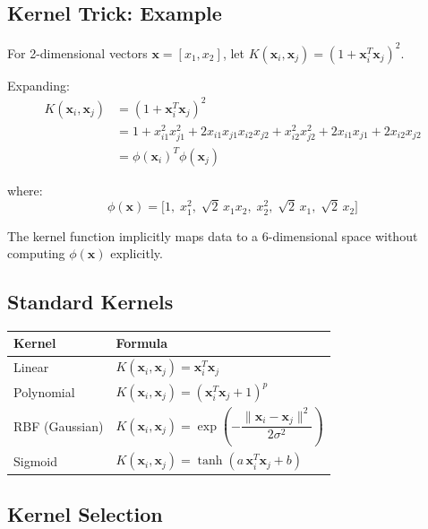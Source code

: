 \documentclass[11pt,a4paper]{article}
\theoremstyle{definition}
\theoremstyle{plain}
\theoremstyle{remark}
\begin{document}
\subsection{Kernel Trick: Example}

For 2-dimensional vectors $\mathbf{x} = [x_1, x_2]$, let $K(\mathbf{x}_i, \mathbf{x}_j) = (1 + \mathbf{x}_i^T \mathbf{x}_j)^2$.

Expanding:
\begin{align*}
K(\mathbf{x}_i, \mathbf{x}_j) &= (1 + \mathbf{x}_i^T \mathbf{x}_j)^2 \\
&= 1 + x_{i1}^2 x_{j1}^2 + 2x_{i1}x_{j1}x_{i2}x_{j2} + x_{i2}^2 x_{j2}^2 + 2x_{i1}x_{j1} + 2x_{i2}x_{j2} \\
&= \phi(\mathbf{x}_i)^T \phi(\mathbf{x}_j)
\end{align*}

where:
\[
\phi(\mathbf{x}) = \big[1, \; x_1^2, \; \sqrt{2}\,x_1 x_2, \; x_2^2, \; \sqrt{2}\,x_1, \; \sqrt{2}\,x_2\big]
\]

The kernel function implicitly maps data to a 6-dimensional space without computing $\phi(\mathbf{x})$ explicitly.

\subsection{Standard Kernels}

\begin{center}
\begin{tabular}{|l|l|}
\hline
\textbf{Kernel} & \textbf{Formula} \\
\hline
Linear & $K(\mathbf{x}_i, \mathbf{x}_j) = \mathbf{x}_i^T \mathbf{x}_j$ \\
\hline
Polynomial & $K(\mathbf{x}_i, \mathbf{x}_j) = (\mathbf{x}_i^T \mathbf{x}_j + 1)^p$ \\
\hline
RBF (Gaussian) & $K(\mathbf{x}_i, \mathbf{x}_j) = \exp\!\left(-\dfrac{\|\mathbf{x}_i - \mathbf{x}_j\|^2}{2\sigma^2}\right)$ \\[8pt]
\hline
Sigmoid & $K(\mathbf{x}_i, \mathbf{x}_j) = \tanh(a \, \mathbf{x}_i^T \mathbf{x}_j + b)$ \\
\hline
\end{tabular}
\end{center}

\subsection{Kernel Selection}
\end{document}

